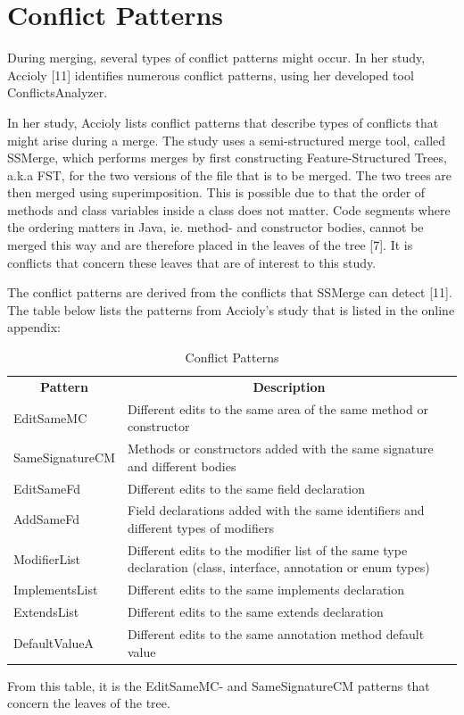 \section{Conflict Patterns}
During merging, several types of conflict patterns might occur. In her study, Accioly [11] identifies numerous conflict patterns, using her developed tool ConflictsAnalyzer.

In her study, Accioly lists conflict patterns that describe types of conflicts that might arise during a merge. The study uses a semi-structured merge tool, called SSMerge, which performs merges by first constructing Feature-Structured Trees, a.k.a FST, for the two versions of the file that is to be merged. The two trees are then merged using superimposition. This is possible due to that the order of methods and class variables inside a class does not matter. Code segments where the ordering matters in Java, ie. method- and constructor bodies, cannot be merged this way and are therefore placed in the leaves of the tree [7]. It is conflicts that concern these leaves that are of interest to this study.

The conflict patterns are derived from the conflicts that SSMerge can detect [11]. The table below lists the patterns from Accioly’s study that is listed in the online appendix:\\ %
\begin{table}
\begin{tabular}{| l | p{12cm} |}
\hline
\multicolumn{1}{c}{\textbf{Pattern}} & \multicolumn{1}{c}{\textbf{Description}}\\
EditSameMC & Different edits to the same area of the same method or constructor\\
SameSignatureCM & Methods or constructors added with the same signature and different bodies\\
EditSameFd & Different edits to the same field declaration\\
AddSameFd & Field declarations added with the same identifiers and different types of modifiers\\
ModifierList & Different edits to the modifier list of the same type declaration (class, interface, annotation or enum types)\\
ImplementsList & Different edits to the same implements declaration\\
ExtendsList & Different edits to the same extends declaration\\
DefaultValueA & Different edits to the same annotation method default value
\end{tabular}
\caption{Conflict Patterns}\label{table:conflictpatterns}
\end{table}
From this table, it is the EditSameMC- and SameSignatureCM patterns that concern the leaves of the tree.




